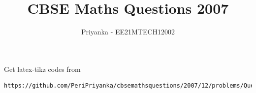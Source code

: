 \documentclass[journal,12pt,twocolumn]{IEEEtran}
\DeclareMathOperator*{\Res}{Res}
\begin{document}
\newtheorem{theorem}{Theorem}[section]
\newtheorem{problem}{Problem}
\newtheorem{proposition}{Proposition}[section]
\newtheorem{lemma}{Lemma}[section]
\newtheorem{corollary}[theorem]{Corollary}
\newtheorem{example}{Example}[section]
\newtheorem{definition}[problem]{Definition}
\newcommand{\BEQA}{\begin{eqnarray}}
\newcommand{\EEQA}{\end{eqnarray}}
\newcommand{\define}{\stackrel{\triangle}{=}}

\providecommand{\mbf}{\mathbf}
\providecommand{\pr}[1]{\ensuremath{\Pr\left(#1\right)}}
\providecommand{\qfunc}[1]{\ensuremath{Q\left(#1\right)}}
\providecommand{\sbrak}[1]{\ensuremath{{}\left[#1\right]}}
\providecommand{\lsbrak}[1]{\ensuremath{{}\left[#1\right.}}
\providecommand{\rsbrak}[1]{\ensuremath{{}\left.#1\right]}}
\providecommand{\brak}[1]{\ensuremath{\left(#1\right)}}
\providecommand{\lbrak}[1]{\ensuremath{\left(#1\right.}}
\providecommand{\rbrak}[1]{\ensuremath{\left.#1\right)}}
\providecommand{\cbrak}[1]{\ensuremath{\left\{#1\right\}}}
\providecommand{\lcbrak}[1]{\ensuremath{\left\{#1\right.}}
\providecommand{\rcbrak}[1]{\ensuremath{\left.#1\right\}}}
\theoremstyle{remark}
\newtheorem{rem}{Remark}
\newcommand{\sgn}{\mathop{\mathrm{sgn}}}
\providecommand{\abs}[1]{\left\vert#1\right\vert}
\providecommand{\res}[1]{\Res\displaylimits_{#1}} 
\providecommand{\norm}[1]{\left\lVert#1\right\rVert}
\providecommand{\mtx}[1]{\mathbf{#1}}
\providecommand{\mean}[1]{E\left[ #1 \right]}
\providecommand{\fourier}{\overset{\mathcal{F}}{ \rightleftharpoons}}
\providecommand{\system}{\overset{\mathcal{H}}{ \longleftrightarrow}}
\newcommand{\solution}{\noindent \textbf{Solution: }}
\newcommand{\cosec}{\,\text{cosec}\,}
\providecommand{\dec}[2]{\ensuremath{\overset{#1}{\underset{#2}{\gtrless}}}}
\newcommand{\myvec}[1]{\ensuremath{\begin{pmatrix}#1\end{pmatrix}}}
\newcommand{\mydet}[1]{\ensuremath{\begin{vmatrix}#1\end{vmatrix}}}
\makeatletter
{}
\makeatother
\let\StandardTheFigure\thefigure
\let\vec\mathbf
\renewcommand{\thefigure}{\theproblem}
\def\putbox#1#2#3{\makebox[0in][l]{\makebox[#1][l]{}\raisebox{\baselineskip}[0in][0in]{\raisebox{#2}[0in][0in]{#3}}}}
     \def\rightbox#1{\makebox[0in][r]{#1}}
     \def\centbox#1{\makebox[0in]{#1}}
     \def\topbox#1{\raisebox{-\baselineskip}[0in][0in]{#1}}
     \def\midbox#1{\raisebox{-0.5\baselineskip}[0in][0in]{#1}}
\vspace{3cm}
\title{CBSE Maths Questions 2007}
\author{Priyanka - EE21MTECH12002}
\maketitle
\newpage
\bigskip
\renewcommand{\thefigure}{\theenumi}
\renewcommand{\thetable}{\theenumi}
%
Get latex-tikz codes from 
%
\begin{lstlisting}
https://github.com/PeriPriyanka/cbsemathsquestions/2007/12/problems/Questions
\end{lstlisting}
\end{document}
